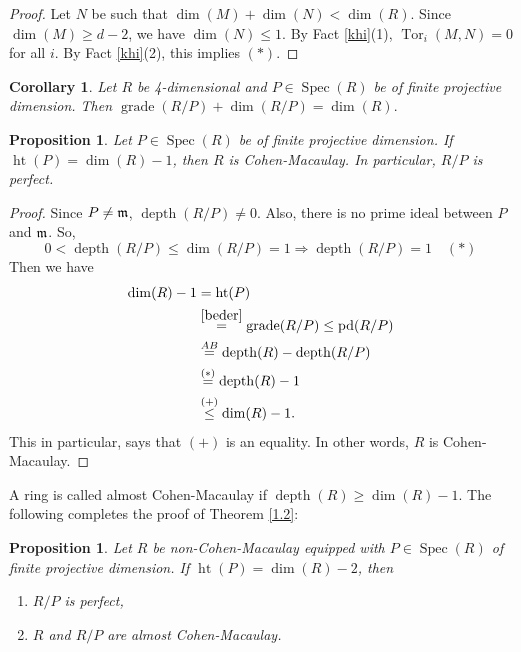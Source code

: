 \documentclass[11.05pt,a4paper]{amsart}
\newtheorem{proposition}[theorem]{Proposition}
\newtheorem{corollary}[theorem]{Corollary}
\theoremstyle{definition}
\theoremstyle{remark}
\newcommand{\grade}{\operatorname{grade}}
\newcommand{\Spec}{\operatorname{Spec}}
\newcommand{\Ht}{\operatorname{ht}}
\newcommand{\pd}{\operatorname{pd}}
\newcommand{\Tor}{\operatorname{Tor}}
\newcommand{\depth}{\operatorname{depth}}
\newcommand{\fm}{\frak{m}}
\begin{document}
\begin{proof}
	Let $N$ be such that $\dim (M )+ \dim( N )< \dim( R)$. Since $\dim (M) \geq d-2$, we have $\dim (N) \leq 1$. By {Fact} \ref{khi}(1), $\Tor_i(M,N) = 0$ for all $i$. By {Fact} \ref{khi}(2), this implies $(*)$.
\end{proof}


\begin{corollary}
Let $R$ be 4-dimensional and $P\in\Spec(R)$ be of finite projective dimension. Then $
\grade(R/P) + \dim (R/P) = \dim (R). $
\end{corollary}


\begin{proposition}\label{9}
	Let $P\in \Spec(R)$ be of finite projective dimension. If $\Ht(P)=\dim(R)-1$, then $R$ is Cohen-Macaulay.	In particular, $R/P$ is perfect.
\end{proposition}


\begin{proof}
	Since $P\neq \fm$, $\depth(R/P)\neq 0$. Also, there is no prime ideal between $P$ and $\fm$. So, $$0<\depth(R/P)\leq \dim(R/P)=1\Rightarrow \depth(R/P)=1\quad(\ast)$$
	Then we have 	\begin{align*}
	\dim(R)-1
	&=  \Ht(P)  \\
	&\stackrel{\ref{beder}}= \grade(R/P) \leq\pd(R/P) \\
	&\stackrel{AB}= \depth(R) - \depth(R/P)\\
	&  \stackrel{(\ast)}=\depth(R) - 1
	\\
	&  \stackrel{(+)}\leq\dim(R) - 1.	\end{align*}This in particular, says that $(+)$ is an equality. In other words, $R$ is Cohen-Macaulay.	
\end{proof}
A ring is called almost Cohen-Macaulay
if $\depth(R)\geq \dim(R)-1$.
The following completes the proof of Theorem \ref{1.2}:
\begin{proposition}\label{10}
	Let $R$  be non-Cohen-Macaulay equipped with $P\in \Spec(R)$   of finite projective dimension. If $\Ht(P)=\dim(R)-2$, then 
	
	
	\begin{enumerate}
		\item $R/P$ is perfect, 
		\item  	$R$ and $R/P$ are almost Cohen-Macaulay.
	\end{enumerate}
	
\end{proposition}
\end{document}
